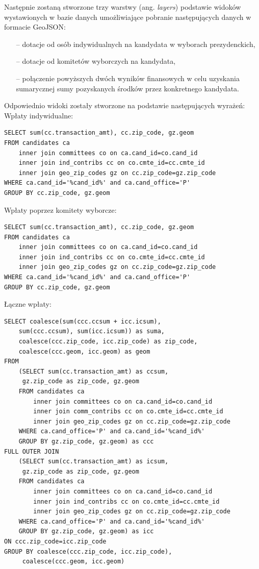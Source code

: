 \documentclass[10pt,a4paper]{article}
\begin{document}
Następnie zostaną stworzone trzy warstwy (ang. \textit{layers}) podstawie widoków wystawionych w bazie danych umożliwiające pobranie następujących danych w formacie GeoJSON:
\begin{itemize}
\item[--] dotacje od osób indywidualnych na kandydata w wyborach prezydenckich,
\item[--] dotacje od komitetów wyborczych na kandydata,
\item[--] połączenie powyższych dwóch wyników finansowych w celu uzyskania sumarycznej sumy pozyskanych środków przez konkretnego kandydata.
\end{itemize}

Odpowiednio widoki zostały stworzone na podstawie następujących wyrażeń:
\bigskip \noindent
Wpłaty indywidualne:
\begin{lstlisting}[style=BashInputStyle]
SELECT sum(cc.transaction_amt), cc.zip_code, gz.geom
FROM candidates ca
	inner join committees co on ca.cand_id=co.cand_id
	inner join ind_contribs cc on co.cmte_id=cc.cmte_id
	inner join geo_zip_codes gz on cc.zip_code=gz.zip_code 
WHERE ca.cand_id='%cand_id%' and ca.cand_office='P'
GROUP BY cc.zip_code, gz.geom
\end{lstlisting}
\bigskip \noindent
Wpłaty poprzez komitety wyborcze:
\begin{lstlisting}[style=BashInputStyle]
SELECT sum(cc.transaction_amt), cc.zip_code, gz.geom
FROM candidates ca
	inner join committees co on ca.cand_id=co.cand_id
	inner join ind_contribs cc on co.cmte_id=cc.cmte_id
	inner join geo_zip_codes gz on cc.zip_code=gz.zip_code 
WHERE ca.cand_id='%cand_id%' and ca.cand_office='P'
GROUP BY cc.zip_code, gz.geom
\end{lstlisting}
\bigskip \noindent
Łączne wpłaty:
\begin{lstlisting}[style=BashInputStyle]
SELECT coalesce(sum(ccc.ccsum + icc.icsum), 
	sum(ccc.ccsum), sum(icc.icsum)) as suma, 
	coalesce(ccc.zip_code, icc.zip_code) as zip_code, 
	coalesce(ccc.geom, icc.geom) as geom 
FROM
	(SELECT sum(cc.transaction_amt) as ccsum,
	 gz.zip_code as zip_code, gz.geom
	FROM candidates ca
		inner join committees co on ca.cand_id=co.cand_id
		inner join comm_contribs cc on co.cmte_id=cc.cmte_id
		inner join geo_zip_codes gz on cc.zip_code=gz.zip_code 
	WHERE ca.cand_office='P' and ca.cand_id='%cand_id%' 
	GROUP BY gz.zip_code, gz.geom) as ccc
FULL OUTER JOIN
	(SELECT sum(cc.transaction_amt) as icsum,
	 gz.zip_code as zip_code, gz.geom
	FROM candidates ca
		inner join committees co on ca.cand_id=co.cand_id
		inner join ind_contribs cc on co.cmte_id=cc.cmte_id
		inner join geo_zip_codes gz on cc.zip_code=gz.zip_code 
	WHERE ca.cand_office='P' and ca.cand_id='%cand_id%' 
	GROUP BY gz.zip_code, gz.geom) as icc
ON ccc.zip_code=icc.zip_code
GROUP BY coalesce(ccc.zip_code, icc.zip_code),
	 coalesce(ccc.geom, icc.geom)
\end{lstlisting}
\end{document}
